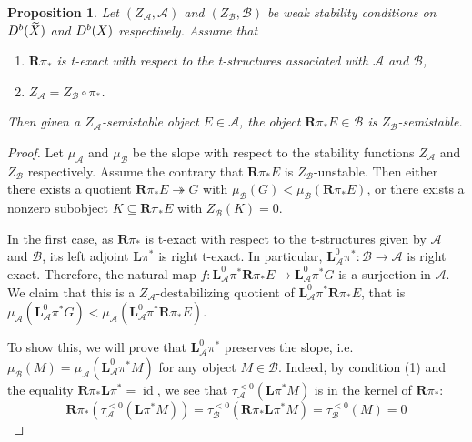 \documentclass[12pt]{amsart}
\newtheorem{proposition}[theorem]{Proposition}
\theoremstyle{definition}
\DeclareMathOperator{\id}{id}
\begin{document}
\begin{proposition}\label{preservess}
Let $(Z_\mathcal{A},\mathcal{A})$ and $(Z_\mathcal{B},\mathcal{B})$ be weak stability conditions on ${\rm D}^b(\widetilde{X})$ and ${\rm D}^b(X)$ respectively.
Assume that 
\begin{enumerate}
    \item[(1)] $\mathbf{R}\pi_\ast$ is t-exact with respect to the t-structures associated with $\mathcal{A}$ and $\mathcal{B}$,
    \item[(2)] $Z_\mathcal{A} =  Z_\mathcal{B} \circ \pi_\ast$.
\end{enumerate}
Then given a $Z_\mathcal{A}$-semistable object $E \in \mathcal{A}$,
the object $\mathbf{R}\pi_\ast E \in \mathcal{B}$ is $Z_\mathcal{B}$-semistable.
\end{proposition}
\begin{proof}
Let $\mu_{\mathcal{A}}$ and $\mu_{\mathcal{B}}$ be the slope with respect to the stability functions $Z_{\mathcal{A}}$ and $Z_{\mathcal{B}}$ respectively.
Assume the contrary that $\mathbf{R}\pi_\ast E$ is $Z_\mathcal{B}$-unstable.
Then either there exists a quotient $\mathbf{R}\pi_\ast E \twoheadrightarrow G$ with $\mu_{\mathcal{B}}(G)<\mu_{\mathcal{B}}(\mathbf{R}\pi_\ast E)$,
or there exists a nonzero subobject $K \subseteq \mathbf{R}\pi_\ast E$ with $Z_{\mathcal{B}}(K)=0$.
  
In the first case, as $\mathbf{R}\pi_\ast$ is t-exact with respect to the t-structures given by $\mathcal{A}$ and $\mathcal{B}$,
its left adjoint $\mathbf{L}\pi^\ast$ is right t-exact.
In particular, $\mathbf{L}^0_{\mathcal{A}}\pi^\ast \colon \mathcal{B} \longrightarrow \mathcal{A}$ is right exact.
Therefore, the natural map $f \colon \mathbf{L}^0_{\mathcal{A}}\pi^\ast \mathbf{R}\pi_\ast E \longrightarrow  \mathbf{L}^0_{\mathcal{A}}\pi^\ast G$ is a surjection in $\mathcal{A}$.
We claim that this is a $Z_\mathcal{A}$-destabilizing quotient of $\mathbf{L}^0_{\mathcal{A}}\pi^\ast \mathbf{R}\pi_\ast E$, that is $\mu_\mathcal{A}(\mathbf{L}^0_{\mathcal{A}}\pi^\ast G)<\mu_\mathcal{A}(\mathbf{L}^0_{\mathcal{A}}\pi^\ast \mathbf{R}\pi_\ast E )$.

To show this, we will prove that $\mathbf{L}^0_{\mathcal{A}}\pi^\ast $ preserves the slope, i.e. $\mu_{\mathcal{B}}(M)=\mu_{\mathcal{A}}(\mathbf{L}^0_{\mathcal{A}}\pi^\ast M)$ for any object $M \in \mathcal{B}$.
Indeed, by condition (1) and the equality $\mathbf{R}\pi_\ast \mathbf{L}\pi^\ast  = \id$,
we see that $\tau^{<0}_{\mathcal{A}}(\mathbf{L}\pi^\ast M)$ is in the kernel of $\mathbf{R}\pi_\ast$:
$$\mathbf{R}\pi_\ast(\tau^{<0}_{\mathcal{A}}(\mathbf{L}\pi^\ast M))= \tau^{<0}_{\mathcal{B}} (\mathbf{R}\pi_\ast \mathbf{L}\pi^\ast M) = \tau^{<0}_{\mathcal{B}} (M) = 0$$


\end{proof}
\end{document}
